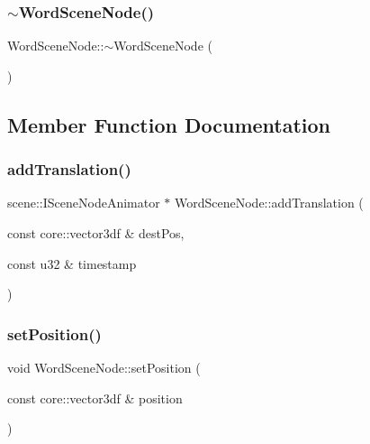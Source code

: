\mbox{\label{class_word_scene_node_aaad0d9d8cb5e79cc40994fd4800cf97e}} 
\subsubsection{\texorpdfstring{$\sim$WordSceneNode()}{~WordSceneNode()}}
{\footnotesize\ttfamily Word\+Scene\+Node\+::$\sim$\+Word\+Scene\+Node (\begin{DoxyParamCaption}{ }\end{DoxyParamCaption})}



\subsection{Member Function Documentation}
\mbox{\label{class_word_scene_node_aef7cd87b51b85d0a5ce1ff2fb6a2181d}} 
\subsubsection{\texorpdfstring{addTranslation()}{addTranslation()}}
{\footnotesize\ttfamily scene\+::\+I\+Scene\+Node\+Animator $\ast$ Word\+Scene\+Node\+::add\+Translation (\begin{DoxyParamCaption}\item[{const core\+::vector3df \&}]{dest\+Pos,  }\item[{const u32 \&}]{timestamp }\end{DoxyParamCaption})}

\mbox{\label{class_word_scene_node_ad70a4b765ef06e2cd64cec7243a536a9}} 
\subsubsection{\texorpdfstring{setPosition()}{setPosition()}}
{\footnotesize\ttfamily void Word\+Scene\+Node\+::set\+Position (\begin{DoxyParamCaption}\item[{const core\+::vector3df \&}]{position }\end{DoxyParamCaption})}

